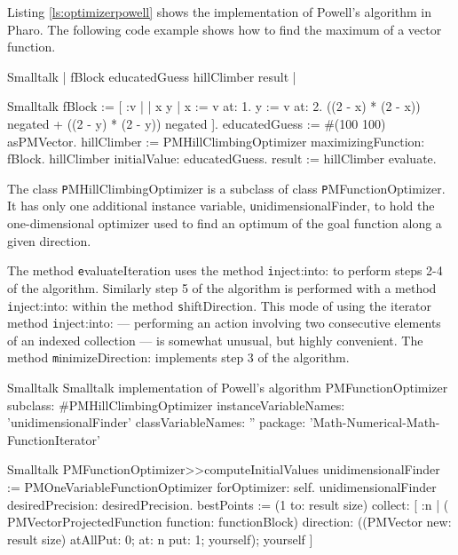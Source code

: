 Listing \ref{ls:optimizerpowell} shows the implementation of Powell's algorithm
in Pharo.
The following code example shows how to find the maximum of a vector function.
\begin{listing}[label=ex:spowell]{Smalltalk}
{}
 | fBlock educatedGuess hillClimber result |
\end{listing}
\begin{displaycode}{Smalltalk}
   fBlock := [ :v | 
   | x y |
   x := v at: 1.
   y := v at: 2.
   ((2 - x) * (2 - x)) negated + ((2 - y) * (2 - y)) negated ].
   educatedGuess := #(100 100) asPMVector.  
   hillClimber := PMHillClimbingOptimizer maximizingFunction: fBlock.
   hillClimber initialValue: educatedGuess.
   result := hillClimber evaluate.
\end{displaycode}
The class {\texttt PMHillClimbingOptimizer} is a subclass of class
{\texttt PMFunctionOptimizer}. It has only one additional instance
variable, {\texttt unidimensionalFinder}, to hold the one-dimensional
optimizer used to find an optimum of the goal function along a
given direction.

The method {\texttt evaluateIteration} uses the method {\texttt
inject:into:} to perform steps 2-4 of the algorithm. Similarly
step 5 of the algorithm is performed with a method {\texttt
inject:into:} within the method {\texttt shiftDirection}. This mode of
using the iterator method {\texttt inject:into:} --- performing an
action involving two consecutive elements of an indexed collection
--- is somewhat unusual, but highly convenient\cite{Beck}. The method {\texttt
minimizeDirection:} implements step 3 of the algorithm.

\begin{listing}[label=ls:optimizerpowell]{Smalltalk}
{Smalltalk implementation of Powell's algorithm}
PMFunctionOptimizer subclass: #PMHillClimbingOptimizer
   instanceVariableNames: 'unidimensionalFinder'
   classVariableNames: ''
   package: 'Math-Numerical-Math-FunctionIterator'
\end{listing}

\begin{displaycode}{Smalltalk}
PMFunctionOptimizer>>computeInitialValues
    unidimensionalFinder := PMOneVariableFunctionOptimizer
                                                   forOptimizer: self.
    unidimensionalFinder desiredPrecision: desiredPrecision.
    bestPoints := (1 to: result size)
                 collect: [ :n | ( PMVectorProjectedFunction
                                      function: functionBlock)
                                     direction: ((PMVector
                                                     new: result size)
                                                         atAllPut: 0;
                                                         at: n put: 1;
                                                         yourself);
                                            yourself
                          ]
\end{displaycode}

